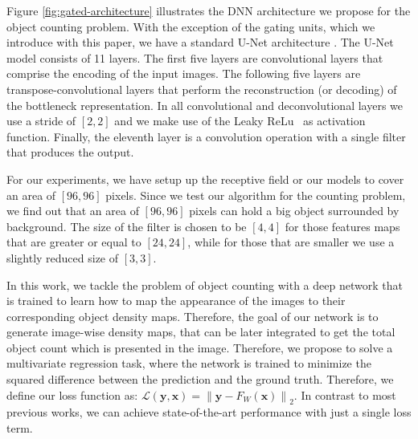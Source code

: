 \documentclass{bmvc2k}
\def\ie{\emph{i.e}\bmvaOneDot}
\begin{document}
Figure \ref{fig:gated-architecture} illustrates the DNN architecture we propose for the object counting problem. With the exception of the gating units, which we introduce with this paper, we have a standard U-Net architecture \cite{unetRonnebergerFB15}. The U-Net model consists of 11 layers. The first five layers are convolutional layers that comprise the encoding of the input images. The following five layers are transpose-convolutional layers \cite{Long_2015_CVPR} that perform the reconstruction (or decoding) of the bottleneck representation. In all convolutional and deconvolutional layers we use a stride of $[2,2]$ and we make use of the Leaky ReLu~\cite{andrew2013} as activation function. Finally, the eleventh layer is a convolution operation with a single filter that produces the output. 


For our experiments, we have setup up the receptive field or our models to cover an area of $[96,96]$ pixels. Since we test our algorithm for the counting problem, we find out that an area of $[96,96]$ pixels can hold a big object surrounded by background. The size of the filter is chosen to be $[4,4]$ for those features maps that are greater or equal to $[24,24]$, while for those that are smaller we use a slightly reduced size of $[3,3]$. 

In this work, we tackle the problem of object counting with a deep network that is trained to learn how to map the appearance of the images to their corresponding object density maps. Therefore, the goal of our network is to generate image-wise density maps, that can be later integrated to get the total object count which is presented in the image. Therefore, we propose to solve a multivariate regression task, where the network is trained to minimize the squared difference between the prediction and the ground truth. Therefore, we define our loss function as: $\mathcal{L}(\boldsymbol{y}, \boldsymbol{x}) = \left \| \boldsymbol{y} - F_W(\boldsymbol{x}) \right \|_2$. In contrast to most previous works, we can achieve state-of-the-art performance with just a single loss term.
\end{document}
